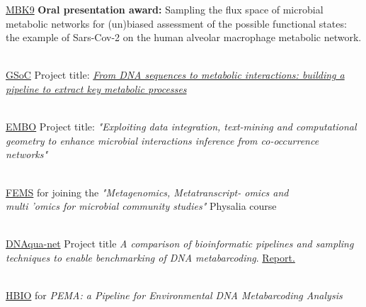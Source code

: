 \documentclass[
    a4paper,
]{../fortysecondscv}
\begin{document}
    \begin{cvtable}

        {\href{https://mikrobiokosmos.org/wp-content/uploads/2022/03/9th_mbk_abstract_book_2021.pdf}{MBK9}}
        {
            \textbf{Oral presentation award:}{
            Sampling the flux space of microbial metabolic networks for (un)biased assessment of the possible functional states:
            the example of Sars-Cov-2 on the human alveolar macrophage metabolic network.
        }}{}

        \\

        {\href{https://summerofcode.withgoogle.com/}{GSoC}}
        {Project title: \textit{\href{https://hariszaf.github.io/gsoc2021/}
        {From DNA sequences to metabolic interactions: building a pipeline to extract key metabolic processes}}}{}

        \\

        {\href{https://www.embo.org/}{EMBO}}
        {Project title: \textit{"Exploiting data integration, text-mining and computational geometry to enhance microbial interactions inference from  co-occurrence networks"}}{}

        \\

        {\href{https://fems-microbiology.org/}{FEMS}}
        {for joining the \textit{"Metagenomics, Metatranscript- omics and \\ 
        multi ’omics for microbial community studies"} Physalia course}{}

        \\
        
        {\href{http://dnaqua.net/}{DNAqua-net}}
        {Project title \textit{A comparison of bioinformatic pipelines and sampling techniques to enable benchmarking of DNA metabarcoding}. \href{http://dnaqua.net/wp-content/uploads/2019/08/Zafeiropoulos.pdf}{Report.}}{}


        \\
        
        {\href{https://hscbio.wordpress.com/}{HBIO}}
        {for \textit{PEMA: a Pipeline for Environmental DNA Metabarcoding Analysis}}{}
        
    \end{cvtable}
\end{document}
